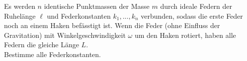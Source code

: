 \begin{Exercise}[label= spring, origin = {3.Runde IPhO, 2009}, title = Federn am Haken, difficulty = 3]
	Es werden $n$ identische Punktmassen der Masse $m$ durch ideale Federn der Ruhelänge $\ell$ und Federkonstanten $k_1,...,k_n$ verbunden, sodass die erste Feder noch an einem Haken befässtigt ist. Wenn die Feder (ohne Einfluss der Gravitation) mit Winkelgeschwindigkeit $\omega$ um den Haken rotiert, haben alle Federn die gleiche Länge $L$.\\
	Bestimme alle Federkonstanten.
\end{Exercise}